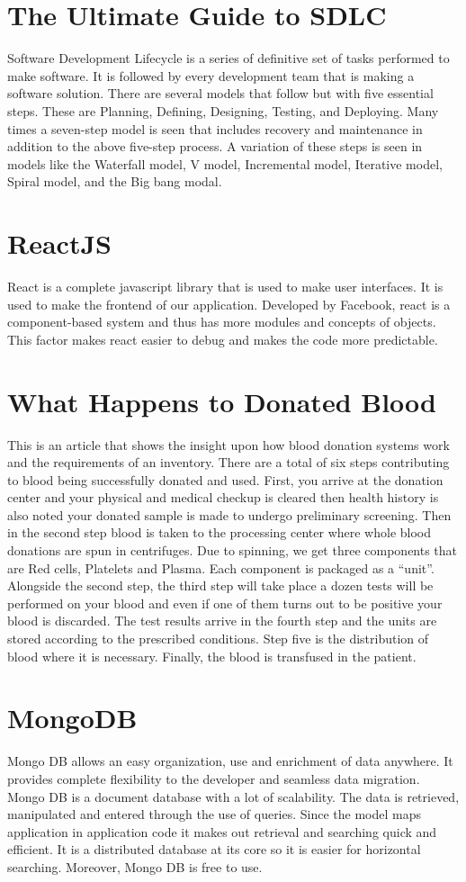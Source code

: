 \documentclass[BTech]{srmuthesis}
\begin{document}
\section{The Ultimate Guide to SDLC}
Software Development Lifecycle is a series of definitive set of tasks performed to make software. It is followed by every development team that is making a software solution. There are several models that follow but with five essential steps. These are Planning, Defining, Designing, Testing, and Deploying. Many times a seven-step model is seen that includes recovery and maintenance in addition to the above five-step process. A variation of these steps is seen in models like the Waterfall model, V model, Incremental model, Iterative model, Spiral model, and the Big bang modal. \cite{sdlc_book}
\section{ReactJS}
React is a complete javascript library that is used to make user interfaces. It is used to make the frontend of our application. Developed by Facebook, react is a component-based system and thus has more modules and concepts of objects.  This factor makes react easier to debug and makes the code more predictable. \cite{reactjs} \cite{nodejs}
\section{What Happens to Donated Blood}
This is an article that shows the insight upon how blood donation systems work and the requirements of an inventory. There are a total of six steps contributing to blood being successfully donated and used. First, you arrive at the donation center and your physical and medical checkup is cleared then health history is also noted your donated sample is made to undergo preliminary screening. Then in the second step blood is taken to the processing center where whole blood donations are spun in centrifuges. Due to spinning, we get three components that are Red cells, Platelets and Plasma. Each component is packaged as a “unit”. Alongside the second step, the third step will take place a dozen tests will be performed on your blood and even if one of them turns out to be positive your blood is discarded. The test results arrive in the fourth step and the units are stored according to the prescribed conditions. Step five is the distribution of blood where it is necessary. Finally, the blood is transfused in the patient. \cite{redcross}
\section{MongoDB}
Mongo DB allows an easy organization, use and enrichment of data anywhere. It provides complete flexibility to the developer and seamless data migration. Mongo DB is a document database with a lot of scalability. 
The data is retrieved, manipulated and entered through the use of queries. Since the model maps application in application code it makes out retrieval and searching quick and efficient. It is a distributed database at its core so it is easier for horizontal searching. Moreover, Mongo DB is free to use. \cite{mongodb}
\end{document}

